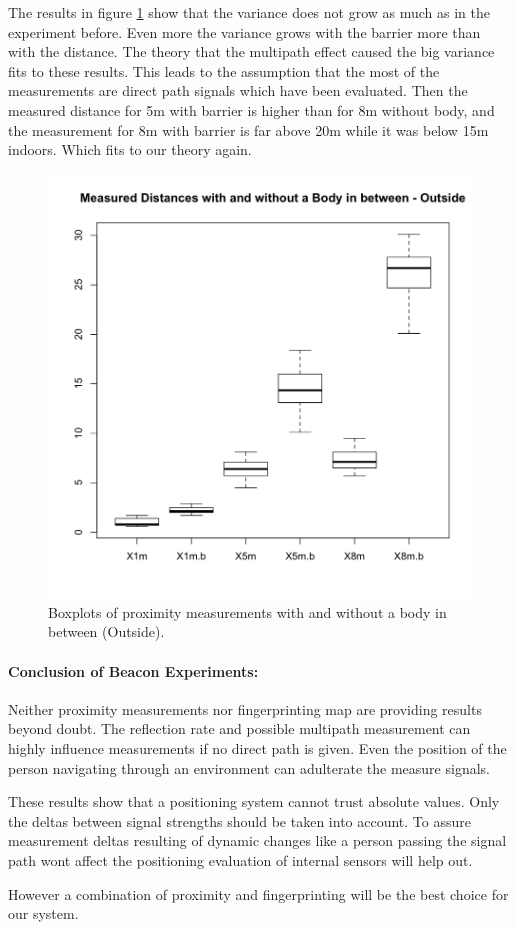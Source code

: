 The results in figure \ref{fig:proxOutside} show that the variance does not grow as much as in the experiment before. Even more the variance grows with the barrier more than with the distance. The theory that the multipath effect caused the big variance fits to these results. This leads to the assumption that the most of the measurements are direct path signals which have been evaluated. Then the measured distance for 5m with barrier is higher than for 8m without body, and the measurement for 8m with barrier is far above 20m while it was below 15m indoors. Which fits to our theory again.

\begin{figure}[h]
	\centering
		\includegraphics[width=.5\textwidth]{images/outsideProx.png}
	\caption{Boxplots of proximity measurements with and without a body in between (Outside).}
	\label{fig:proxOutside}
\end{figure}

\paragraph{Conclusion of Beacon Experiments: }
Neither proximity measurements nor fingerprinting map are providing results beyond doubt. The reflection rate and possible multipath measurement can highly influence measurements if no direct path is given. Even the position of the person navigating through an environment can adulterate the measure signals. 

These results show that a positioning system cannot trust absolute values. Only the deltas between signal strengths should be taken into account. To assure measurement deltas resulting of dynamic changes like a person passing the signal path wont affect the positioning evaluation of internal sensors will help out. 

However a combination of proximity and fingerprinting will be the best choice for our system.

